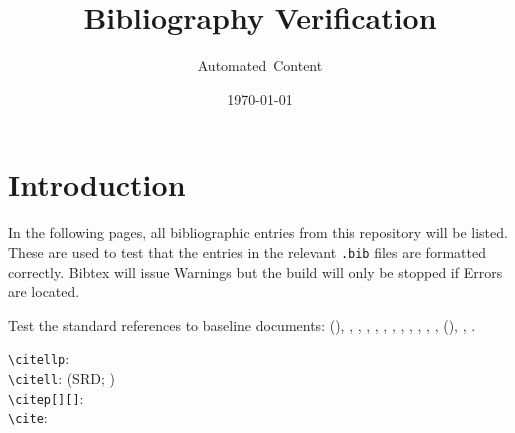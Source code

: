 \documentclass[DM,toc]{lsstdoc}
\title[Bib testing]{Bibliography Verification}
\author{Automated~Content}
\date{\today}
\begin{document}
\maketitle

\section{Introduction}

In the following pages, all bibliographic entries from this repository will be listed.
These are used to test that the entries in the relevant \texttt{.bib} files are formatted correctly.
Bibtex will issue Warnings but the build will only be stopped if Errors are located.

Test the standard references to baseline documents: (\SRD), \DPDD, \LSR, \OSS, \DMSR, \appsUMLdomain, \appsUMLusecase, \SUI, \DMSD, \MOPSD, \DMMD, \DMOps, (\SDQAP), \NewPCP, \UCAL.

\verb|\citellp|:  \\
\verb|\citell|: (SRD; ) \\
\verb|\citep[][]|: \citep[e.g.,][are interesting]{LPM-17,LSE-29} \\
\verb|\cite|: \cite{LPM-17,LSE-29}

\nocite{*}


\end{document}
